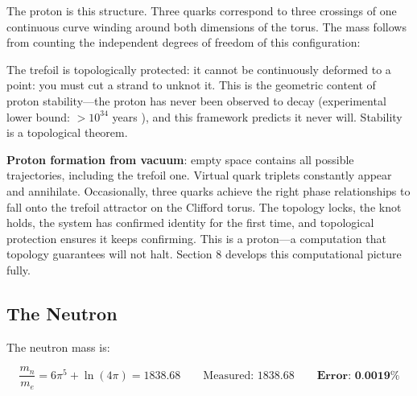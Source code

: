 \documentclass[12pt]{article}
\begin{document}
The proton is this structure. Three quarks correspond to three crossings of one continuous curve winding around both dimensions of the torus. The mass follows from counting the independent degrees of freedom of this configuration:

\begin{center}
\end{center}

\medskip
The trefoil is topologically protected: it cannot be continuously deformed to a point: you must cut a strand to unknot it. This is the geometric content of proton stability---the proton has never been observed to decay (experimental lower bound: $>10^{34}$ years \cite{superkamiokande2020}), and this framework predicts it never will. Stability is a topological theorem.

\textbf{Proton formation from vacuum}: empty space contains all possible trajectories, including the trefoil one. Virtual quark triplets constantly appear and annihilate. Occasionally, three quarks achieve the right phase relationships to fall onto the trefoil attractor on the Clifford torus. The topology locks, the knot holds, the system has confirmed identity for the first time, and topological protection ensures it keeps confirming. This is a proton---a computation that topology guarantees will not halt. Section 8 develops this computational picture fully.

\subsection{The Neutron}

The neutron mass is:

$$\frac{m_n}{m_e} = 6\pi^5 + \ln(4\pi) = 1838.68 \qquad \text{Measured: } 1838.68 \qquad \textbf{Error: 0.0019\%}$$
\end{document}
